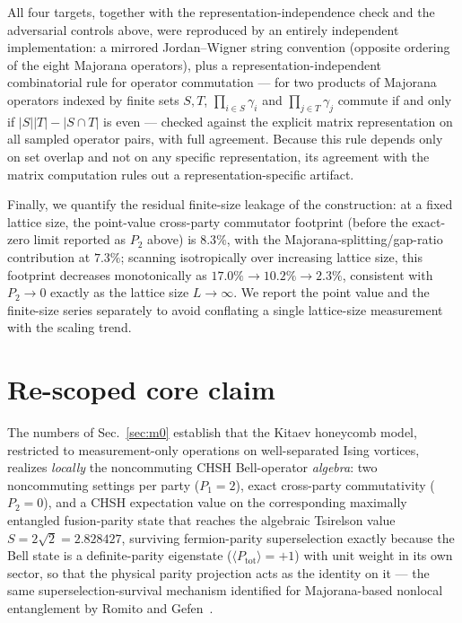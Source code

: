 \documentclass[aps,pra,twocolumn,superscriptaddress,floatfix,nofootinbib]{revtex4-2}
\begin{document}
All four targets, together with the representation-independence check
and the adversarial controls above, were reproduced by an entirely
independent implementation: a mirrored Jordan--Wigner string
convention (opposite ordering of the eight Majorana operators), plus a
representation-independent combinatorial rule for operator
commutation --- for two products of Majorana operators indexed by
finite sets $S,T$, $\prod_{i\in S}\gamma_i$ and $\prod_{j\in T}\gamma_j$
commute if and only if $|S||T|-|S\cap T|$ is even --- checked against
the explicit matrix representation on all sampled operator pairs, with
full agreement. Because this rule depends only on set overlap and not
on any specific representation, its agreement with the matrix
computation rules out a representation-specific artifact.

Finally, we quantify the residual finite-size leakage of the
construction: at a fixed lattice size, the point-value cross-party
commutator footprint (before the exact-zero limit reported as $P_2$
above) is $8.3\%$, with the Majorana-splitting/gap-ratio contribution
at $7.3\%$; scanning isotropically over increasing lattice size, this
footprint decreases monotonically as $17.0\%\to10.2\%\to2.3\%$,
consistent with $P_2\to0$ exactly as the lattice size
$L\to\infty$. We report the point value and the finite-size series
separately to avoid conflating a single lattice-size measurement with
the scaling trend.

\section{Re-scoped core claim}
\label{sec:rescope}

The numbers of Sec.~\ref{sec:m0} establish that the Kitaev honeycomb
model, restricted to measurement-only operations on well-separated
Ising vortices, realizes \emph{locally} the noncommuting CHSH
Bell-operator \emph{algebra}: two noncommuting settings per party
($P_1=2$), exact cross-party commutativity ($P_2=0$), and a CHSH
expectation value on the corresponding maximally entangled fusion-parity
state that reaches the algebraic Tsirelson value
$S=2\sqrt2=2.828427$, surviving fermion-parity superselection exactly
because the Bell state is a definite-parity eigenstate
($\langle P_{\mathrm{tot}}\rangle=+1$) with unit weight in its own
sector, so that the physical parity projection acts as the identity on
it --- the same superselection-survival mechanism identified for
Majorana-based nonlocal entanglement by Romito and
Gefen~\cite{RomitoGefen2017}.
\end{document}
